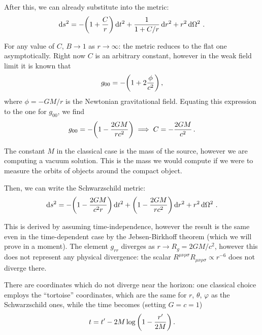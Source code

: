 \documentclass[main.tex]{subfiles}
\begin{document}
After this, we can already substitute into the metric: 
%
\begin{align}
\dd{s^2} = - \qty(1 + \frac{C}{r}) \dd{t^2} 
+ \frac{1}{1 + C/r} \dd{r^2} + r^2 \dd{\Omega^2}
\,.
\end{align}

For any value of \(C\), \(B \to 1\) as \(r \to \infty \): the metric reduces to the flat one asymptotically. 
Right now \(C\) is an arbitrary constant, however in the weak field limit it is known that 
%
\begin{align}
g_{00} = - \qty(1 + 2 \frac{\phi }{c^2})
\,,
\end{align}
%
where \(\phi = - GM / r\) is the Newtonian gravitational field.
Equating this expression to the one for \(g_{00} \), we find 
%
\begin{align}
g_{00} = - \qty(1 - \frac{2 GM}{rc^2})
\implies C = - \frac{2GM}{c^2}
\,.
\end{align}

The constant \(M\) in the classical case is the mass of the source, however we are computing a vacuum solution. This is the mass we would compute if we were to measure the orbits of objects around the compact object.


Then, we can write the Schwarzschild metric: 
%
\begin{align}
\dd{s^2} = - \qty(1 - \frac{2GM}{c^2r}) \dd{t^2}
+ \qty(1 - \frac{2GM}{rc^2}) \dd{r^2} + r^2 \dd{\Omega^2}
\,.
\end{align}

This is derived by assuming time-independence, however the result is the same even in the time-dependent case by the Jebsen-Birkhoff theorem (which we will prove in a moment). 
The element \(g_{rr} \) diverges as \(r \to R_g = 2GM/c^2\), however this does not represent any physical divergence: the scalar \(R^{\mu \nu \rho \sigma } R_{\mu \nu \rho \sigma } \propto r^{-6}\) does not diverge there. 

There are coordinates which do not diverge near the horizon: one classical choice employs the ``tortoise'' coordinates, which are the same for \(r\), \(\theta \), \(\varphi \) as the Schwarzschild ones, while the time becomes (setting \(G = c =  1\))
%
\begin{align}
t = t' - 2M \log \qty(1 - \frac{r'}{2M})
\,.
\end{align}
\end{document}
